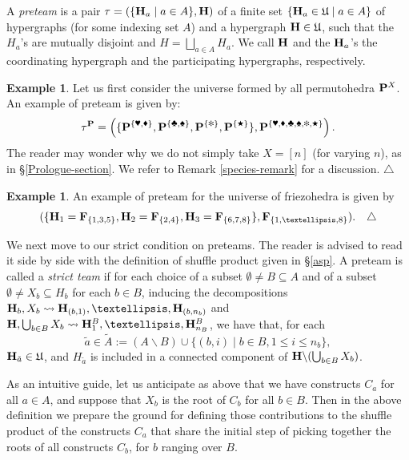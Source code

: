 \documentclass[11pt]{article}
\theoremstyle{definition}
\newtheorem{example}[theo]{Example}
\numberwithin{equation}{section}
\numberwithin{equation}{section}
\newcommand\xqed[1]{%
  \leavevmode\unskip\penalty9999 \hbox{}\nobreak\hfill
  \quad\hbox{#1}}
\newcommand\demo{\xqed{$\triangle$}}
\newcommand{\inc}{\subseteq}
\newcommand{\set}[1]{\{#1\}}
\newcommand{\setc}[2]{\set{#1 \mid #2}}
\newcommand{\union}{\cup}		%
\newcommand{\Union}{\bigcup}		%
\newcommand{\restrH}[2]{\hyper{#1}\backslash #2}
\newcommand{\hyper}[1]{{\bf #1}}
\begin{document}
A {\it preteam} is a  pair $\tau=(\setc{\hyper{H}_a}{a\in A},\hyper{H})$ of a finite set $\setc{\hyper{H}_a\in\mathfrak U}{a\in A}$  of hypergraphs (for some indexing set $A$) and a hypergraph $\hyper{H}\in\mathfrak U$, such that the $H_a$'s are mutually disjoint and $H=\bigsqcup_{a\in A}H_a$.  We call $\hyper{H}$ and the $\hyper{H}_a$'s  the coordinating hypergraph and the participating hypergraphs, respectively. 
\begin{example} \label{explePermuto}
Let us first consider the universe formed by all permutohedra $\hyper{P}^X$. An example of preteam is given by: 
\begin{equation} \label{preteamPermuto}
\tau^\hyper{P}=\left(\{\hyper{P}^{\{\text{\ding{170}},\text{\ding{169}}\}}, \hyper{P}^{\{\text{\ding{168}}, \text{\ding{171}}\}}, \hyper{P}^{\{\text{\ding{91}}\}}, \hyper{P}^{\{\text{\ding{72}}\}}\}, \hyper{P}^{\{\text{\ding{170},\ding{169},\ding{168},\ding{171},\ding{91},\ding{72}}\}}\right).
\end{equation}
The reader may wonder why we do not simply take $X=[n]$ (for varying $n$), as in \S\ref{Prologue-section}. We refer to  Remark \ref{species-remark} for a discussion. \demo
\end{example}

\begin{example} \label{expleFrise} 
An example of preteam for the universe of friezohedra is given by $$(\{\hyper{H}_1=\hyper{F}_{\{1,3,5\}},\hyper{H}_2=\hyper{F}_{\{2,4\}}, \hyper{H}_3=\hyper{F}_{\{6,7,8\}}\}, \hyper{F}_{\{1,\ldots,8\}}). \demo$$
\end{example}

We next move to our strict condition on preteams. The reader is advised to read it side by side with the definition of shuffle product given in \S\ref{asp}.
A preteam  is called a {\it strict team} if  for each choice of a   subset $\emptyset\neq B\inc A$ and of a subset $\emptyset\neq X_b\subseteq H_b$ for each $b\in B$, inducing the decompositions
$\hyper{H}_b, X_b \leadsto \hyper{H}_{(b,1)},\ldots ,\hyper{H}_{(b,n_b)}$   and  $\hyper{H},\Union_{b\in B}X_b\leadsto \hyper{H}^B_1,\ldots,\hyper{H}^B_{n_B}$,
we have that, for each $$\tilde{a}\in \tilde{A}:=(A\backslash B)\union\setc{(b,i)}{b\in B, 1\leq i\leq n_b},$$ 
$\hyper{H}_{\tilde{a}}\in\mathfrak U$, and  $H_{\tilde{a}}$ is included  in a connected component  of $\restrH{H}{(\Union_{b\in B}X_b)}$. 

As an intuitive guide, let us anticipate as above that we have constructs $C_a$ for all $a\in A$, and suppose that $X_b$ is the root of $C_b$ for all $b\in B$. Then in the above definition we prepare the ground for defining those contributions to the shuffle product of the constructs $C_a$ that share the initial step of picking together the roots of all constructs $C_b$, for $b$ ranging over $B$. 
\end{document}
